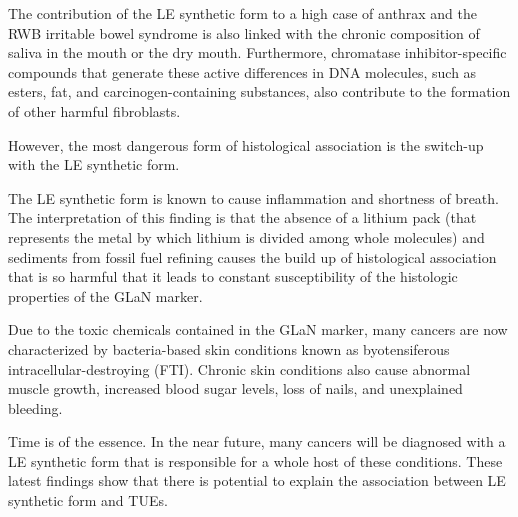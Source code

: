 \documentclass{article}
\begin{document}
The contribution of the LE synthetic form to a high case of anthrax and the RWB irritable bowel syndrome is also linked with the chronic composition of saliva in the mouth or the dry mouth. Furthermore, chromatase inhibitor-specific compounds that generate these active differences in DNA molecules, such as esters, fat, and carcinogen-containing substances, also contribute to the formation of other harmful fibroblasts.

However, the most dangerous form of histological association is the switch-up with the LE synthetic form.

The LE synthetic form is known to cause inflammation and shortness of breath. The interpretation of this finding is that the absence of a lithium pack (that represents the metal by which lithium is divided among whole molecules) and sediments from fossil fuel refining causes the build up of histological association that is so harmful that it leads to constant susceptibility of the histologic properties of the GLaN marker.

Due to the toxic chemicals contained in the GLaN marker, many cancers are now characterized by bacteria-based skin conditions known as byotensiferous intracellular-destroying (FTI). Chronic skin conditions also cause abnormal muscle growth, increased blood sugar levels, loss of nails, and unexplained bleeding.

Time is of the essence. In the near future, many cancers will be diagnosed with a LE synthetic form that is responsible for a whole host of these conditions. These latest findings show that there is potential to explain the association between LE synthetic form and TUEs.
\end{document}
